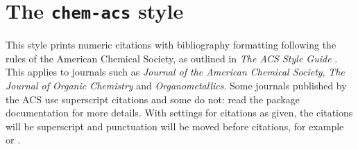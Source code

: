 \documentclass[a4paper]{article}
\begin{document}
\section*{The \texttt{chem-acs} style}

This style prints numeric citations with bibliography
formatting following the rules of the American Chemical Society,
as outlined in \emph{The ACS Style Guide} \cite{Coghill2006}.
This applies to journals such as \emph{Journal of the American
Chemical Society}, \emph{The Journal of Organic Chemistry}
and \emph{Organometallics}.  Some journals published by the ACS
use superscript citations and some do not: read the package
documentation for more details. With settings for citations as 
given, the citations will be superscript and punctuation will be
moved before citations, for example \autocite{Kabbe1973} or
\autocite{Arduengo1991}.

\nocite{*}

\printbibliography
\end{document}
